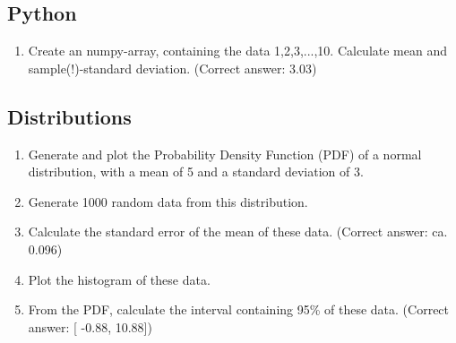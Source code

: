 \subsection*{Python}
\begin{enumerate}
  \item Create an numpy-array, containing the data 1,2,3,...,10. Calculate mean and sample(!)-standard deviation.
    (Correct answer: 3.03)
\end{enumerate}

\subsection*{Distributions}


\begin{enumerate}
  \item  Generate and plot the Probability Density Function (PDF) of a normal distribution, with a mean of 5 and a standard deviation of 3.
  \item  Generate 1000 random data from this distribution.
  \item  Calculate the standard error of the mean of these data.
    (Correct answer: ca. 0.096)

  \item  Plot the histogram of these data.
  \item  From the PDF, calculate the interval containing 95\% of these data.
    (Correct answer: [ -0.88, 10.88])
\end{enumerate}

